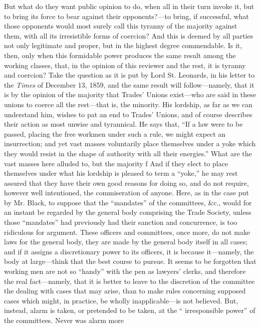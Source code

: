 But what do they want public opinion to do, when all in their turn
invoke it, but to bring its force to bear against their opponents?---to
bring, if successful, what those opponents would most surely call this
tyranny of the majority against them, with all its irresistible forms of
coercion? And this is deemed by all parties not only legitimate and
proper, but in the highest degree commendable. Is it, then, only when
this formidable power produces the same result among the working
classes, that, in the opinion of this reviewer and the rest, it is
tyranny and coercion? Take the question as it is put by Lord St.
Leonards, in his letter to the \textit{Times} of December 13, 1859, and
the same result will follow---namely, that it is by the opinion of the
majority that Trades' Unions exist---who are said in these unions to
coerce all the rest---that is, the minority. His lordship, as far as we
can understand him, wishes to pat an end to Trades' Unions, and of
course describes their action as most unwise and tyrannical. He says
that, ``If a law were to be passed, placing the free workmen under such
a rule, we might expect an insurrection; and yet vast masses voluntarily
place themselves under a yoke which they would resist in the shape of
authority with all their energies.'' What are the vast masses here
alluded to, but the majority f And if they elect to place themselves
under what his lordship is pleased to term a ``yoke,'' he may rest
assured that they have their own good reasons for doing so, and do not
require, however well intentioned, the commiseration of anyone. Here, as
in the case put by Mr. Black, to suppose that the ``mandates'' of the
committees, \&c., would for an instant be regarded by the general body
comprising the Trade Society, unless those ``mandates'' had previously
had their sanction and concurrence, is too ridiculous for argument.
These officers and committees, once more, do not make laws for the
general body, they are made by the general body itself in all cases; and
if it assigns a discretionary power to its officers, it is because
it---namely, the body at large---think that the best course to pursue.
It seems to be forgotten that working men are not so ``handy'' with the
pen as lawyers' clerks, and therefore the real fact---namely, that it is
better to leave to the discretion of the committee the dealing with
cases that may arise, than to make rules concerning supposed cases which
might, in practice, be wholly inapplicable---is not believed. But,
instead, alarm is taken, or pretended to be taken, at the ``
irresponsible power'' of the committees. Never was alarm more
